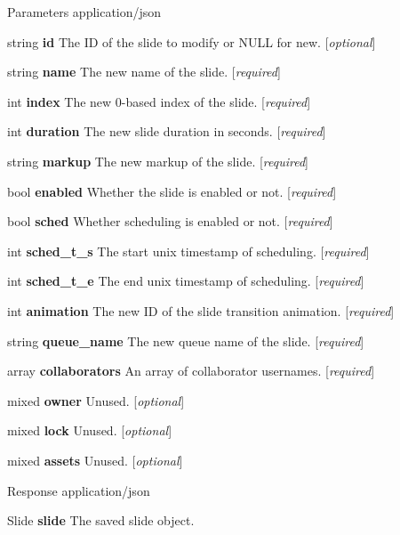 \begin{DoxyParagraph}{Parameters}
application/json
\begin{DoxyItemize}
\item {\ttfamily string} {\bfseries id} The ID of the slide to modify or N\+U\+LL for new. \mbox{[}{\itshape optional}\mbox{]}
\item {\ttfamily string} {\bfseries name} The new name of the slide. \mbox{[}{\itshape required}\mbox{]}
\item {\ttfamily int} {\bfseries index} The new 0-\/based index of the slide. \mbox{[}{\itshape required}\mbox{]}
\item {\ttfamily int} {\bfseries duration} The new slide duration in seconds. \mbox{[}{\itshape required}\mbox{]}
\item {\ttfamily string} {\bfseries markup} The new markup of the slide. \mbox{[}{\itshape required}\mbox{]}
\item {\ttfamily bool} {\bfseries enabled} Whether the slide is enabled or not. \mbox{[}{\itshape required}\mbox{]}
\item {\ttfamily bool} {\bfseries sched} Whether scheduling is enabled or not. \mbox{[}{\itshape required}\mbox{]}
\item {\ttfamily int} {\bfseries sched\+\_\+t\+\_\+s} The start unix timestamp of scheduling. \mbox{[}{\itshape required}\mbox{]}
\item {\ttfamily int} {\bfseries sched\+\_\+t\+\_\+e} The end unix timestamp of scheduling. \mbox{[}{\itshape required}\mbox{]}
\item {\ttfamily int} {\bfseries animation} The new ID of the slide transition animation. \mbox{[}{\itshape required}\mbox{]}
\item {\ttfamily string} {\bfseries queue\+\_\+name} The new queue name of the slide. \mbox{[}{\itshape required}\mbox{]}
\item {\ttfamily array} {\bfseries collaborators} An array of collaborator usernames. \mbox{[}{\itshape required}\mbox{]}
\item {\ttfamily mixed} {\bfseries owner} Unused. \mbox{[}{\itshape optional}\mbox{]}
\item {\ttfamily mixed} {\bfseries lock} Unused. \mbox{[}{\itshape optional}\mbox{]}
\item {\ttfamily mixed} {\bfseries assets} Unused. \mbox{[}{\itshape optional}\mbox{]}
\end{DoxyItemize}
\end{DoxyParagraph}
\begin{DoxyParagraph}{Response}
application/json
\begin{DoxyItemize}
\item {\ttfamily Slide} {\bfseries slide} The saved slide object.
\end{DoxyItemize}
\end{DoxyParagraph}
